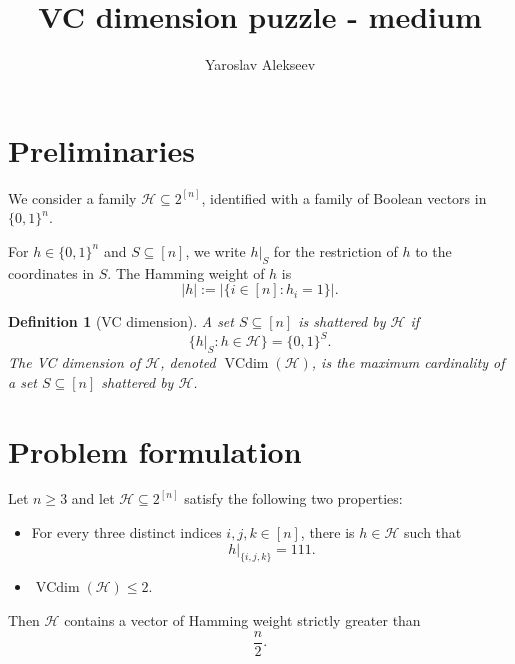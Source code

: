\documentclass[10pt]{article}
\title{VC dimension puzzle - medium}
\author{Yaroslav Alekseev}
\date{}
\newtheorem{definition}{Definition}
\begin{document}
\maketitle

\section{Preliminaries}

We consider a family $\mathcal{H}\subseteq 2^{[n]}$, identified with a family
of Boolean vectors in $\{0,1\}^n$.

For $h\in\{0,1\}^n$ and $S\subseteq[n]$, we write $h|_S$ for the restriction
of $h$ to the coordinates in $S$. The Hamming weight of $h$ is
\[
|h|:=\bigl|\{i\in[n]:h_i=1\}\bigr|.
\]

\begin{definition}[VC dimension]
A set $S\subseteq[n]$ is \emph{shattered} by $\mathcal{H}$ if
\[
\{h|_S:h\in\mathcal{H}\}=\{0,1\}^S.
\]
The \emph{VC dimension} of $\mathcal{H}$, denoted
$\operatorname{VCdim}(\mathcal{H})$, is the maximum cardinality of a set
$S\subseteq[n]$ shattered by $\mathcal{H}$.
\end{definition}

\section{Problem formulation}

Let $n\ge3$ and let $\mathcal{H}\subseteq 2^{[n]}$ satisfy the following two properties:
\begin{itemize}
    \item For every three distinct indices $i,j,k\in[n]$, there is
    $h\in\mathcal{H}$ such that
    \[
    h|_{\{i,j,k\}}=111.
    \]
    \item $\operatorname{VCdim}(\mathcal{H})\le 2$.
\end{itemize}
Then $\mathcal{H}$ contains a vector of Hamming weight strictly greater than
\[
\frac{n}{2}.
\]
\end{document}
